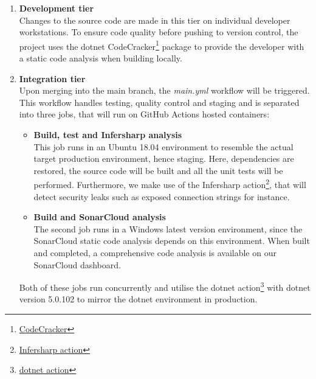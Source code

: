 \documentclass[report/main.tex]{subfiles}
\begin{document}
        
                \begin{enumerate}
                    \item \textbf{Development tier} \\
                    Changes to the source code are made in this tier on individual developer workstations. To ensure code quality before pushing to version control, the project uses the dotnet CodeCracker\footnote{\href{https://github.com/code-cracker/code-cracker}{CodeCracker}} package to provide the developer with a static code analysis when building locally. 
                    
                    \item \textbf{Integration tier} \\
                    Upon merging into the main branch, the \textit{main.yml} workflow will be triggered. This workflow handles testing, quality control and staging and is separated into three jobs, that will run on GitHub Actions hosted containers: 
                    
                    \begin{itemize}
                        \item \textbf{Build, test and Infersharp analysis} \\
                        This job runs in an Ubuntu 18.04 environment to resemble the actual target production environment, hence staging. Here, dependencies are restored, the source code will be built and all the unit tests will be performed. Furthermore, we make use of the Infersharp action\footnote{\href{https://github.com/microsoft/infersharpaction}{Infersharp action}}, that will detect security leaks such as exposed connection strings for instance.  
                        
                        \item \textbf{Build and SonarCloud analysis} \\
                        The second job runs in a Windows latest version environment, since the SonarCloud static code analysis depends on this environment. When built and completed, a comprehensive code analysis is available on our SonarCloud dashboard. 
                        
                    \end{itemize}
                    
                    Both of these jobs run concurrently and utilise the dotnet action\footnote{\href{https://github.com/actions/setup-dotnet}{dotnet action}} with dotnet version 5.0.102 to mirror the dotnet environment in production. 
                    

\end{enumerate}
\end{document}
